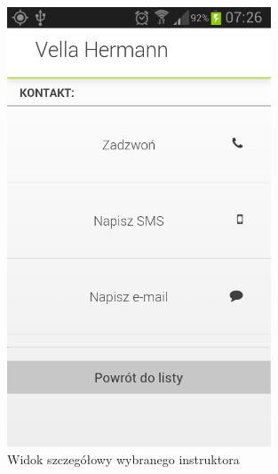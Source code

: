 \documentclass[twoside,a4paper,openright,12pt]{book}
\begin{document}
\begin{figure}[htbp]
\centering
\includegraphics[width=0.7\textwidth]{screenshots/android/widok_szczegolowy_instruktora.png}
\caption{Widok szczegółowy wybranego instruktora}
\end{figure}
\end{document}
